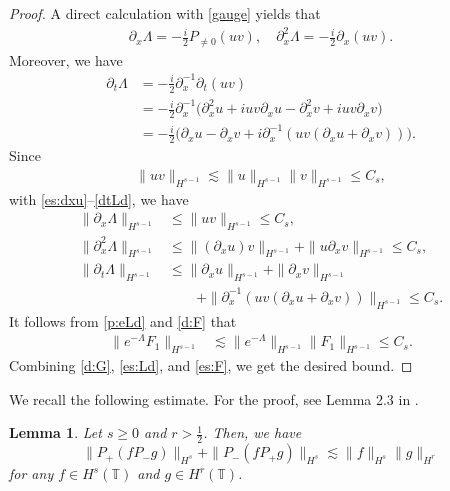 \documentclass[%
11pt,  reqno]{amsart}
\newtheorem{lemma}[theorem]{Lemma}
\newcommand{\T}{\mathbb{T}}
\newcommand{\Ld}{\Lambda}
\newcommand{\dx}{\partial_x}
\newcommand{\dt}{\partial_t}
\newcommand{\les}{\lesssim}
\newcommand{\nz}{P_{\neq 0}}
\numberwithin{equation}{section}
\numberwithin{theorem}{section}
\begin{document}
\begin{proof}
A direct calculation with \eqref{gauge} yields that
\begin{equation}
\begin{aligned}
\dx \Ld = - \frac i2 \nz (uv), \quad
\dx^2 \Ld = - \frac i2 \dx (uv).
\end{aligned}
\label{dxLd}
\end{equation}
Moreover, we have
\begin{equation}
\begin{aligned}
\dt \Ld 
&= 
- \frac i2 \dx^{-1} \dt (u v)
\\
&=
- \frac i2 \dx^{-1} \big( \dx^2 u + i u v \dx u - \dx^2 v + i u v \dx v \big)
\\
&= - \frac i2 \big( \dx u - \dx v + i \dx^{-1} (u v (\dx u + \dx v) ) \big).
\end{aligned}
\label{dtLd}
\end{equation}
Since
\begin{equation*}
\begin{aligned}
\| u v \|_{H^{s-1}} 
\les \| u \|_{H^{s-1}} \|v \|_{H^{s-1}} 
\le C_s,
\end{aligned}
\end{equation*}
with \eqref{es:dxu}--\eqref{dtLd}, 
we have
\begin{equation}
\begin{aligned}
\|\dx \Ld\|_{H^{s-1}} 
&\le \|u v\|_{H^{s-1}} 
\le C_s,
\\
\| \dx^2 \Ld \|_{H^{s-1}}
&\le
\| (\dx u) v \|_{H^{s-1}} + \| u \dx v \|_{H^{s-1}} 
\le C_s,
\\
\| \dt \Ld \|_{H^{s-1}}
&\le
\| \dx u \|_{H^{s-1}} + \| \dx v \|_{H^{s-1}} 
\\
&\qquad+  \| \dx^{-1} (u v (\dx u + \dx v)) \|_{H^{s-1}}
\le
C_s.
\end{aligned}
\label{es:Ld}
\end{equation}
It follows from \eqref{p:eLd} and \eqref{d:F} that
\begin{equation}
\begin{aligned}
\|e^{-\Ld} F_1\|_{H^{s-1}}
&\les
\| e^{-\Ld} \|_{H^{s-1}} \|F_1\|_{H^{s-1}} 
\le
C_s. 
\end{aligned}
\label{es:F}
\end{equation}
Combining \eqref{d:G}, \eqref{es:Ld}, and \eqref{es:F}, we get the desired bound.
\end{proof} 

We recall the following estimate.
For the proof, see Lemma 2.3 in \cite{KoOk25b}.
\begin{lemma}
\label{lem:bili3}
Let $s \ge 0$ and $r>\frac 12$.
Then, we have
\[
\| P_+(f P_- g) \|_{H^s} + \| P_-(f P_+ g) \|_{H^s}
\les \| f \|_{H^s} \| g \|_{H^r}
\]
for any $f \in H^s(\T)$ and $g \in H^r(\T)$.
\end{lemma}
\end{document}
